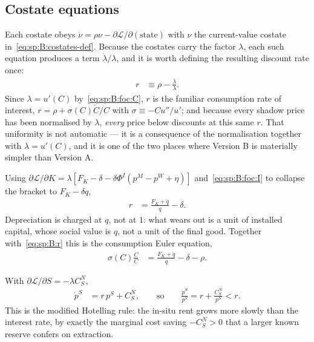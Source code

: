 \subsection{Costate equations}\label{sec:sp:B:costates}

Each costate obeys $\dot\nu=\rho\nu-\partial\mathcal L/\partial(\text{state})$ with $\nu$ the
current-value costate in~\eqref{eq:sp:B:costates-def}. Because the costates carry the factor $\lambda$,
each such equation produces a term $\dot\lambda/\lambda$, and it is worth defining the resulting
discount rate once:
\begin{align}
r &\equiv \rho-\frac{\dot\lambda}{\lambda}.
\label{eq:sp:B:r}
\end{align}
Since $\lambda=u'(C)$ by~\eqref{eq:sp:B:foc:C}, $r$ is the familiar consumption rate of interest,
$r=\rho+\sigma(C)\dot C/C$ with $\sigma\equiv-Cu''/u'$; and because every shadow price has been
normalised by $\lambda$, \emph{every} price below discounts at this same $r$. That uniformity is not
automatic --- it is a consequence of the normalisation together with $\lambda=u'(C)$, and it is one of
the two places where Version B is materially simpler than Version A.

 Using $\partial\mathcal L/\partial K=\lambda\left[F_K-\delta-\delta\Phi^I
\left(p^M-p^W+\eta\right)\right]$ and~\eqref{eq:sp:B:foc:I} to collapse the bracket to $F_K-\delta q$,
\begin{align}
r &= \frac{F_K+\dot q}{q}-\delta .
\label{eq:sp:B:costate:K}
\end{align}
Depreciation is charged at $q$, not at $1$: what wears out is a unit of installed capital, whose social
value is $q$, not a unit of the final good. Together with~\eqref{eq:sp:B:r} this is the consumption
Euler equation,
\begin{align}
\sigma\left(C\right)\frac{\dot C}{C} &= \frac{F_K+\dot q}{q}-\delta-\rho .
\label{eq:sp:B:euler}
\end{align}

 With $\partial\mathcal L/\partial S=-\lambda C^N_S$,
\begin{align}
\dot p^S &= r\,p^S+C^N_S,
\qquad\text{so}\qquad
\frac{\dot p^S}{p^S} = r+\frac{C^N_S}{p^S}<r .
\label{eq:sp:B:costate:S}
\end{align}
This is the modified Hotelling rule: the in-situ rent grows more slowly than the interest rate, by
exactly the marginal cost saving $-C^N_S>0$ that a larger known reserve confers on extraction.


